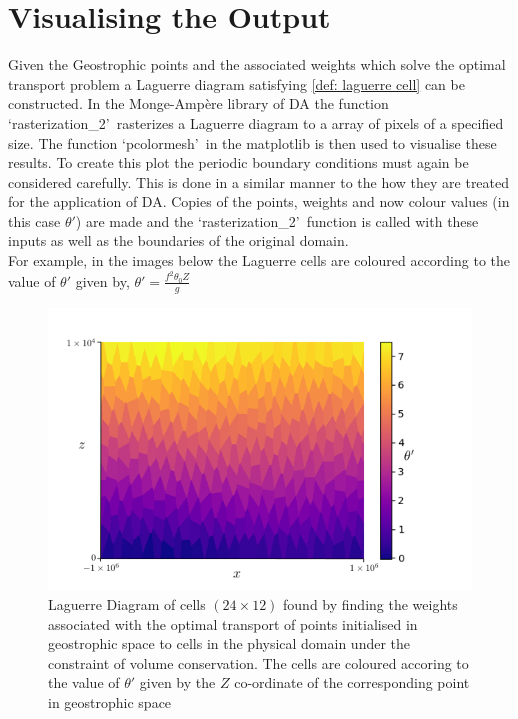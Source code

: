 \section{Visualising the Output \label{plotting}}
Given the Geostrophic points and the associated weights which solve the optimal transport problem a Laguerre diagram satisfying \ref{def: laguerre cell} can be constructed. In the Monge-Amp\`{e}re library of DA \cite{Merigot2017,Merigot2017a} the function \textquoteleft rasterization\_2\textquoteright \ rasterizes a Laguerre diagram to a array of pixels of a specified size. The function \textquoteleft pcolormesh\textquoteright \ in the matplotlib is then used to visualise these results. To create this plot the periodic boundary conditions must again be considered carefully. This is done in a similar manner to the how they are treated for the application of DA. Copies of the points, weights and now colour values (in this case $\theta '$) are made and the \textquoteleft rasterization\_2\textquoteright \ function is called with these inputs as well as the boundaries of the original domain.\\
For example, in the images below the Laguerre cells are coloured according to the value of $\theta '$ given by, $\theta ' = \frac{f^2\theta_0 Z}{g}$
\begin{figure}[h]
	\centering
	\includegraphics[width=0.7\linewidth]{project/laguerre_diagram_colour}
	\caption[Coloured Laguerre Diagram of Cells]{Laguerre Diagram of cells $(24\times 12)$ found by finding the weights associated with the optimal transport of points initialised in geostrophic space to cells in the physical domain under the constraint of volume conservation. The cells are coloured accoring to the value of $\theta '$ given by the $Z$ co-ordinate of the corresponding point in geostrophic space}
	\label{fig:laguerrediagramcolour}
\end{figure}


